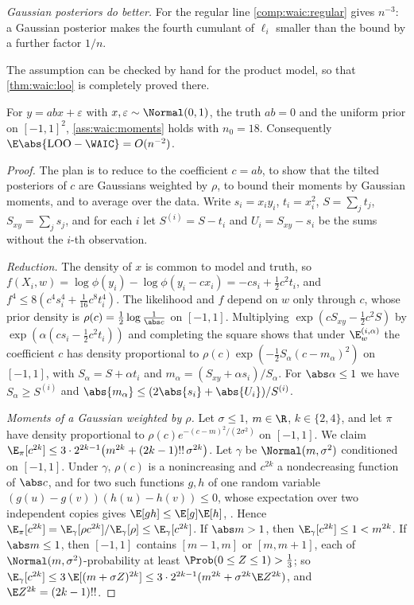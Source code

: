 \begin{refsection}
\emph{Gaussian posteriors do better.} For the regular line \cref{comp:waic:regular} gives $n^{-3}$: a Gaussian posterior makes the fourth cumulant of $\ell_i$ smaller than the bound by a further factor $1/n$.

The assumption can be checked by hand for the product model, so that \cref{thm:waic:loo} is completely proved there.

\begin{proposition}\label{prop:waic:product}
For $y=abx+\varepsilon$ with $x,\varepsilon\sim\Normal(0,1)$, the truth $ab=0$ and the uniform prior on $[-1,1]^2$, \cref{ass:waic:moments} holds with $n_0=18$. Consequently $\E\abs{\waicLOO-\WAIC}=O(n^{-2})$.
\end{proposition}

\begin{proof}
The plan is to reduce to the coefficient $c=ab$, to show that the tilted posteriors of $c$ are Gaussians weighted by $\rho$, to bound their moments by Gaussian moments, and to average over the data. Write $s_i=x_iy_i$, $t_i=x_i^2$, $S=\sum_jt_j$, $S_{xy}=\sum_js_j$, and for each $i$ let $S^{(i)}=S-t_i$ and $U_i=S_{xy}-s_i$ be the sums without the $i$-th observation.

\emph{Reduction.} The density of $x$ is common to model and truth, so $f(X_i,w)=\log\phi(y_i)-\log\phi(y_i-cx_i)=-cs_i+\tfrac12c^2t_i$, and $f^4\le8(c^4s_i^4+\tfrac1{16}c^8t_i^4)$. The likelihood and $f$ depend on $w$ only through $c$, whose prior density is $\rho(c)=\tfrac12\log\frac1{\abs c}$ on $[-1,1]$. Multiplying $\exp(cS_{xy}-\tfrac12c^2S)$ by $\exp(\alpha(cs_i-\tfrac12c^2t_i))$ and completing the square shows that under $\E^{(i,\alpha)}_w$ the coefficient $c$ has density proportional to $\rho(c)\exp(-\tfrac12S_\alpha(c-m_\alpha)^2)$ on $[-1,1]$, with $S_\alpha=S+\alpha t_i$ and $m_\alpha=(S_{xy}+\alpha s_i)/S_\alpha$. For $\abs\alpha\le1$ we have $S_\alpha\ge S^{(i)}$ and $\abs{m_\alpha}\le(2\abs{s_i}+\abs{U_i})/S^{(i)}$.

\emph{Moments of a Gaussian weighted by $\rho$.} Let $\sigma\le1$, $m\in\R$, $k\in\{2,4\}$, and let $\pi$ have density proportional to $\rho(c)e^{-(c-m)^2/(2\sigma^2)}$ on $[-1,1]$. We claim $\E_\pi[c^{2k}]\le3\cdot2^{2k-1}\bigl(m^{2k}+(2k-1)!!\,\sigma^{2k}\bigr)$. Let $\gamma$ be $\Normal(m,\sigma^2)$ conditioned on $[-1,1]$. Under $\gamma$, $\rho(c)$ is a nonincreasing and $c^{2k}$ a nondecreasing function of $\abs c$, and for two such functions $g,h$ of one random variable $(g(u)-g(v))(h(u)-h(v))\le0$, whose expectation over two independent copies gives $\E[gh]\le\E[g]\E[h]$, . Hence $\E_\pi[c^{2k}]=\E_\gamma[\rho c^{2k}]/\E_\gamma[\rho]\le\E_\gamma[c^{2k}]$. If $\abs m>1$, then $\E_\gamma[c^{2k}]\le1<m^{2k}$. If $\abs m\le1$, then $[-1,1]$ contains $[m-1,m]$ or $[m,m+1]$, each of $\Normal(m,\sigma^2)$-probability at least $\Prob(0\le Z\le1)>\tfrac13$; so $\E_\gamma[c^{2k}]\le3\,\E[(m+\sigma Z)^{2k}]\le3\cdot2^{2k-1}(m^{2k}+\sigma^{2k}\E Z^{2k})$, and $\E Z^{2k}=(2k-1)!!$.


\end{proof}
\end{refsection}
